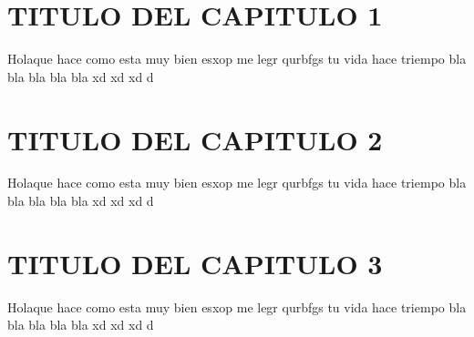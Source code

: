 \documentclass[a4paper, 12pt]{report}
\begin{document}
\chapter{TITULO DEL CAPITULO 1}\label{cap1}
\pagestyle{plain}
\vspace*{-2em}
\begin{justify}
Holaque hace como esta muy bien esxop me legr qurbfgs tu vida hace triempo bla bla bla bla bla xd xd xd d
\end{justify}

\vspace*{5em}
\chapter{TITULO DEL CAPITULO 2}
\vspace*{-2em}
\begin{justify}
Holaque hace como esta muy bien esxop me legr qurbfgs tu vida hace triempo bla bla bla bla bla xd xd xd d
\end{justify}

\vspace*{5em}
\chapter{TITULO DEL CAPITULO 3}
\vspace*{-2em}
\begin{justify}
Holaque hace como esta muy bien esxop me legr qurbfgs tu vida hace triempo bla bla bla bla bla xd xd xd d
\end{justify}

\vspace*{5em}
\end{document}
